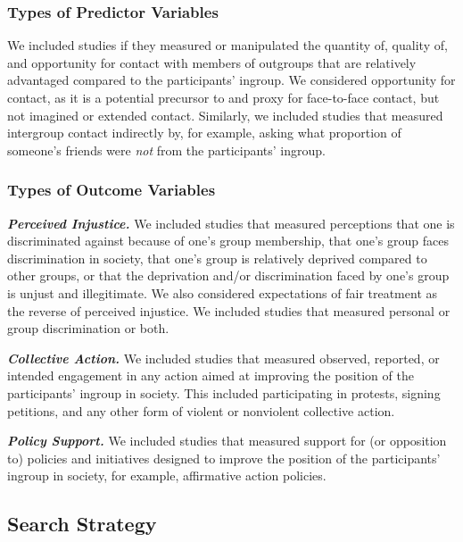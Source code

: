 \documentclass[12pt, letterpaper]{article}
\begin{document}
\hypertarget{types-of-predictor-variables}{%
\subsubsection{Types of Predictor
Variables}\label{types-of-predictor-variables}}

We included studies if they measured or manipulated the quantity of,
quality of, and opportunity for contact with members of outgroups that
are relatively advantaged compared to the participants' ingroup. We
considered opportunity for contact, as it is a potential precursor to
and proxy for face-to-face contact, but not imagined or extended
contact. Similarly, we included studies that measured intergroup contact
indirectly by, for example, asking what proportion of someone's friends
were \emph{not} from the participants' ingroup.

\hypertarget{types-of-outcome-variables}{%
\subsubsection{Types of Outcome
Variables}\label{types-of-outcome-variables}}

\textbf{\emph{Perceived Injustice.}} We included studies that measured
perceptions that one is discriminated against because of one's group
membership, that one's group faces discrimination in society, that one's
group is relatively deprived compared to other groups, or that the
deprivation and/or discrimination faced by one's group is unjust and
illegitimate. We also considered expectations of fair treatment as the
reverse of perceived injustice. We included studies that measured
personal or group discrimination or both.

\textbf{\emph{Collective Action.}} We included studies that measured
observed, reported, or intended engagement in any action aimed at
improving the position of the participants' ingroup in society. This
included participating in protests, signing petitions, and any other
form of violent or nonviolent collective action.

\textbf{\emph{Policy Support.}} We included studies that measured
support for (or opposition to) policies and initiatives designed to
improve the position of the participants' ingroup in society, for
example, affirmative action policies.

\hypertarget{search-strategy}{%
\subsection{Search Strategy}\label{search-strategy}}
\end{document}
